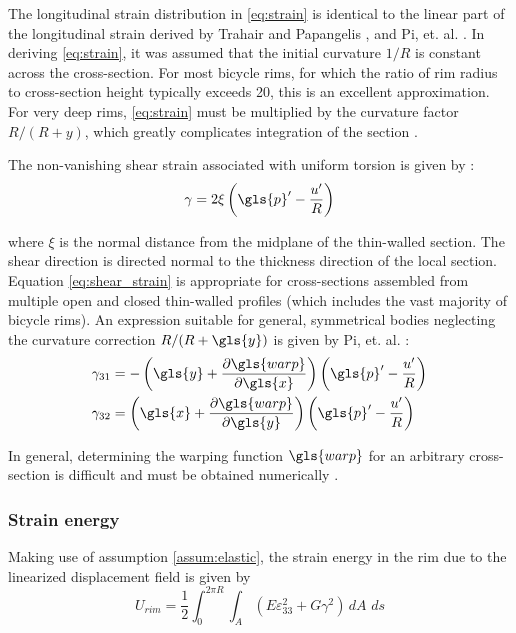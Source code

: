 \documentclass[\rootdir/thesis.tex]{subfiles}
\begin{document}
The longitudinal strain distribution in \eqref{eq:strain} is identical to the linear part of the longitudinal strain derived by Trahair and Papangelis \cite{Trahair1987}, and Pi, et. al. \cite{Pi1995}. In deriving \eqref{eq:strain}, it was assumed that the initial curvature $1/R$ is constant across the cross-section. For most bicycle rims, for which the ratio of rim radius to cross-section height typically exceeds 20, this is an excellent approximation. For very deep rims, \eqref{eq:strain} must be multiplied by the curvature factor $R/(R+y)$, which greatly complicates integration of the section \cite{Kang1994,Lim2004,Ryu2012}.

The non-vanishing shear strain associated with uniform torsion is given by \cite{Pi1995,Kang1994}:
\begin{equation}
\label{eq:shear_strain}
\gamma = 2 \xi \left(\gls{p}' - \frac{u'}{R}\right)
\end{equation}

where $\xi$ is the normal distance from the midplane of the thin-walled section. The shear direction is directed normal to the thickness direction of the local section. Equation \eqref{eq:shear_strain} is appropriate for cross-sections assembled from multiple open and closed thin-walled profiles (which includes the vast majority of bicycle rims). An expression suitable for general, symmetrical bodies neglecting the curvature correction $R/(R+\gls{y})$ is given by Pi, et. al. \cite{Bradford2006b}:
\begin{subequations}
\begin{align}
\gamma_{31} &= -\left(\gls{y} + \frac{\partial \gls{warp}}{\partial \gls{x}}\right)\left(\gls{p}' - \frac{u'}{R}\right)\\
\gamma_{32} &= \left(\gls{x} + \frac{\partial \gls{warp}}{\partial \gls{y}}\right)\left(\gls{p}' - \frac{u'}{R}\right)
\end{align}
\end{subequations}

In general, determining the warping function $\gls{warp}$ for an arbitrary cross-section is difficult and must be obtained numerically \cite{Timoshenko1961}.


\subsubsection{Strain energy}
Making use of assumption \ref{assum:elastic}, the strain energy in the rim due to the linearized displacement field is given by
\begin{equation}
\label{eq:U_rim_gen}
U_{rim} = \frac{1}{2}\int_0^{2\pi R} \int_A (E\varepsilon_{33}^2 + G\gamma^2) \,dA\,\, ds
\end{equation}
\end{document}

